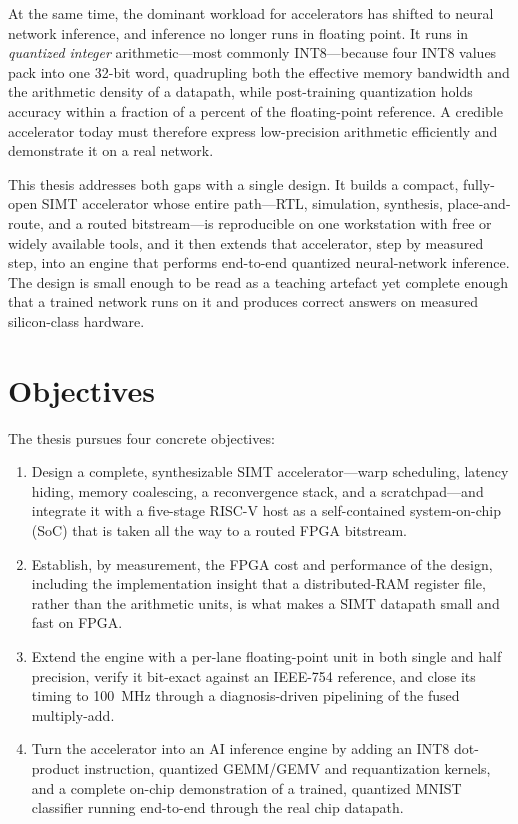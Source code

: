 \documentclass[12pt,a4paper,oneside]{report}
\begin{document}
At the same time, the dominant workload for accelerators has shifted to neural
network inference, and inference no longer runs in floating point. It runs in
\emph{quantized integer} arithmetic---most commonly INT8---because four INT8
values pack into one 32-bit word, quadrupling both the effective memory bandwidth
and the arithmetic density of a datapath, while post-training quantization holds
accuracy within a fraction of a percent of the floating-point reference. A
credible accelerator today must therefore express low-precision arithmetic
efficiently and demonstrate it on a real network.

This thesis addresses both gaps with a single design. It builds a compact,
fully-open SIMT accelerator whose entire path---RTL, simulation, synthesis,
place-and-route, and a routed bitstream---is reproducible on one workstation with
free or widely available tools, and it then extends that accelerator, step by
measured step, into an engine that performs end-to-end quantized neural-network
inference. The design is small enough to be read as a teaching artefact yet
complete enough that a trained network runs on it and produces correct answers on
measured silicon-class hardware.

\section{Objectives}
The thesis pursues four concrete objectives:
\begin{enumerate}
\item Design a complete, synthesizable SIMT accelerator---warp scheduling,
latency hiding, memory coalescing, a reconvergence stack, and a scratchpad---and
integrate it with a five-stage RISC-V host as a self-contained system-on-chip
(SoC) that is taken all the way to a routed FPGA bitstream.
\item Establish, by measurement, the FPGA cost and performance of the design,
including the implementation insight that a distributed-RAM register file, rather
than the arithmetic units, is what makes a SIMT datapath small and fast on FPGA.
\item Extend the engine with a per-lane floating-point unit in both single and
half precision, verify it bit-exact against an IEEE-754 reference, and close its
timing to \SI{100}{\mega\hertz} through a diagnosis-driven pipelining of the
fused multiply-add.
\item Turn the accelerator into an AI inference engine by adding an INT8
dot-product instruction, quantized GEMM/GEMV and requantization kernels, and a
complete on-chip demonstration of a trained, quantized MNIST classifier running
end-to-end through the real chip datapath.
\end{enumerate}
\end{document}
